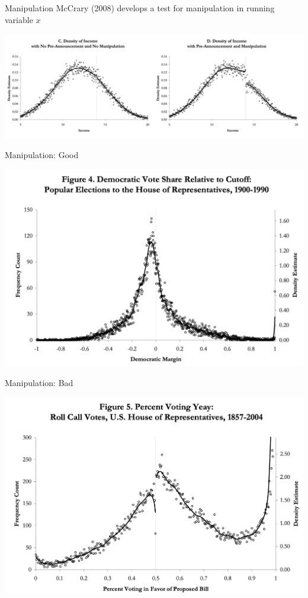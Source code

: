 \documentclass[xcolor=pdftex,dvipsnames,table,mathserif,aspectratio=169]{beamer}
\begin{document}
\begin{frame}{Manipulation}
McCrary (2008) develops a test for manipulation in running variable $x$
\begin{center}
\includegraphics[width=5.75in]{./resources/mccrary1.png}
\end{center}
\end{frame}


\begin{frame}{Manipulation: Good}
\begin{center}
\includegraphics[height=0.9\textheight]{./resources/mccrary2.png}
\end{center}
\end{frame}


\begin{frame}{Manipulation: Bad}
\begin{center}
\includegraphics[height=0.9\textheight]{./resources/mccrary3.png}
\end{center}
\end{frame}
\end{document}
